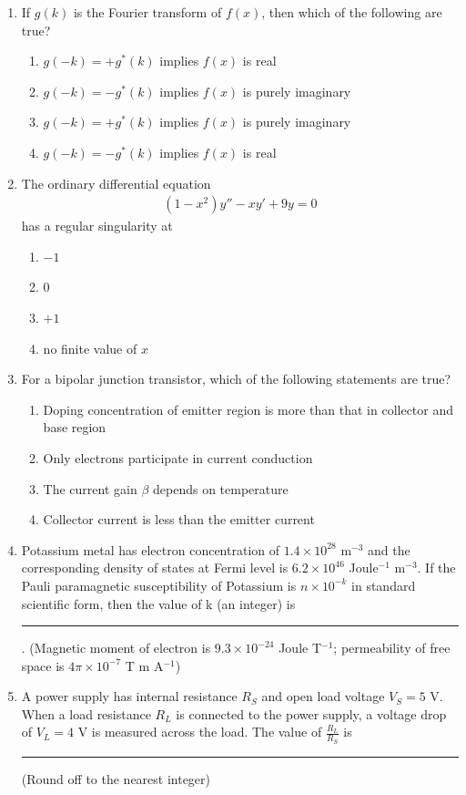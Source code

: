 \documentclass[journal,12pt,onecolumn]{IEEEtran}
\theoremstyle{remark}
\begin{document}
\begin{enumerate}
\item
If $g(k)$ is the Fourier transform of $f(x)$, then which of the following are true?
\begin{enumerate}
    \item $g(-k) = +g^*(k)$ implies $f(x)$ is real
    \item $g(-k) = -g^*(k)$ implies $f(x)$ is purely imaginary
    \item $g(-k) = +g^*(k)$ implies $f(x)$ is purely imaginary
    \item $g(-k) = -g^*(k)$ implies $f(x)$ is real
\end{enumerate}


\item
The ordinary differential equation \begin{align*}(1 - x^2)y'' - xy' + 9y = 0\end{align*} has a regular singularity at
\begin{enumerate}
    \item $-1$
    \item $0$
    \item $+1$
    \item no finite value of $x$
\end{enumerate}


\item
For a bipolar junction transistor, which of the following statements are true?
\begin{enumerate}
    \item Doping concentration of emitter region is more than that in collector and base region
    \item Only electrons participate in current conduction
    \item The current gain $\beta$ depends on temperature
    \item Collector current is less than the emitter current
\end{enumerate}


\item
Potassium metal has electron concentration of $1.4 \times 10^{28}$ m$^{-3}$ and the corresponding density of states at Fermi level is $6.2 \times 10^{46}$ Joule$^{-1}$ m$^{-3}$. If the Pauli paramagnetic susceptibility of Potassium is $n \times 10^{-k}$ in standard scientific form, then the value of k (an integer) is \rule{1cm}{0.4pt}. (Magnetic moment of electron is $9.3 \times 10^{-24}$ Joule T$^{-1}$; permeability of free space is $4\pi \times 10^{-7}$ T m A$^{-1}$)


\item
A power supply has internal resistance $R_S$ and open load voltage $V_S = 5$ V. When a load resistance $R_L$ is connected to the power supply, a voltage drop of $V_L = 4$ V is measured across the load. The value of $\frac{R_L}{R_S}$ is \rule{1cm}{0.4pt} (Round off to the nearest integer)



\end{enumerate}
\end{document}

